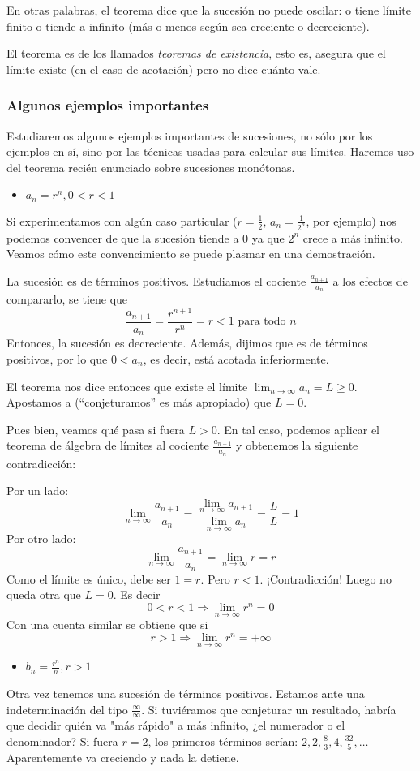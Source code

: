 \documentclass[../Teoría.root.tex]{subfiles}
\begin{document}
En otras palabras, el teorema dice que la sucesión no puede oscilar:
o tiene límite finito o tiende a infinito (más o menos según sea creciente o decreciente).

El teorema es de los llamados \textit{teoremas de existencia}, esto es, asegura que el límite existe (en el caso de acotación) pero no dice cuánto vale.

\subsubsection{Algunos ejemplos importantes}
Estudiaremos algunos ejemplos importantes de sucesiones, no sólo por los ejemplos en sí, sino por las técnicas usadas para calcular sus límites.
Haremos uso del teorema recién enunciado sobre sucesiones monótonas.
\begin{itemize}
    \item \(a_n=r^n, 0<r<1\)
\end{itemize}
Si experimentamos con algún caso particular (\(r=\frac{1}{2},\,a_n=\frac{1}{2^n}\), por ejemplo) nos podemos convencer de que la sucesión tiende a 0 ya que \(2^n\) crece a más infinito.
Veamos cómo este convencimiento se puede plasmar en una demostración.

La sucesión es de términos positivos.
Estudiamos el cociente \(\frac{a_{n+1}}{a_n}\) a los efectos de compararlo, se tiene que
\[\frac{a_{n+1}}{a_n}=\frac{r^{n+1}}{r^n}=r<1\text{ para todo }n\]
Entonces, la sucesión es decreciente.
Además, dijimos que es de términos positivos, por lo que \(0<a_n\), es decir, está acotada inferiormente.

El teorema nos dice entonces que existe el límite \(\lim_{n\to\infty}a_n=L\geq0\).
Apostamos a (“conjeturamos” es más apropiado) que \(L=0\).

Pues bien, veamos qué pasa si fuera \(L>0\).
En tal caso, podemos aplicar el teorema de álgebra de límites al cociente \(\frac{a_{n+1}}{a_n}\) y obtenemos la siguiente contradicción:

Por un lado:
\[\lim_{n\to\infty}\frac{a_{n+1}}{a_n}=\frac{\lim_{n\to\infty}a_{n+1}}{\lim_{n\to\infty}a_n}=\frac{L}{L}=1\]
Por otro lado:
\[\lim_{n\to\infty}\frac{a_{n+1}}{a_n}=\lim_{n\to\infty}r=r\]
Como el límite es único, debe ser \(1=r\).
Pero \(r<1\).
¡Contradicción!
Luego no queda otra que \(L=0\).
Es decir
\[0<r<1\Rightarrow\lim_{n\to\infty}r^n=0\]
Con una cuenta similar se obtiene que si
\[r>1\Rightarrow\lim_{n\to\infty}r^n=+\infty\]
\begin{itemize}
    \item \(b_n=\frac{r^n}{n}, r>1\)
\end{itemize}
Otra vez tenemos una sucesión de términos positivos.
Estamos ante una indeterminación del tipo \(\frac{\infty}{\infty}\).
Si tuviéramos que conjeturar un resultado, habría que decidir quién va "más rápido" a más infinito, ¿el numerador o el denominador?
Si fuera \(r=2\), los primeros términos serían:
\(2,2,\frac{8}{3},4,\frac{32}{5},\dots\)
Aparentemente va creciendo y nada la detiene.
\end{document}
